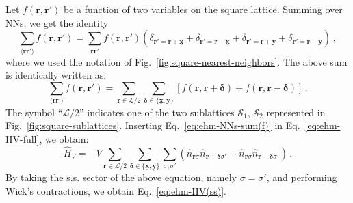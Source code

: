 \begin{tabproof}

	Let $f(\mathbf{r},\mathbf{r}')$ be a function of two variables on the square lattice. Summing over NNs, we get the identity
	\[
		\sum_{\langle \mathbf{r}\mathbf{r}' \rangle} f(\mathbf{r},\mathbf{r}') = \sum_{\mathbf{r}\mathbf{r}'} f(\mathbf{r},\mathbf{r}') \left(
			\delta_{\mathbf{r}'=\mathbf{r}+\underline{\mathbf{x}}} + \delta_{\mathbf{r}'=\mathbf{r}-\underline{\mathbf{x}}} + \delta_{\mathbf{r}'=\mathbf{r}+\underline{\mathbf{y}}} + \delta_{\mathbf{r}'=\mathbf{r}-\underline{\mathbf{y}}}
		\right) \, ,
	\]
	where we used the notation of Fig.~\ref{fig:square-nearest-neighbors}. The above sum is identically written as:
	\begin{equation}\label{eq:ehm-NNs-sum(f)}
		\sum_{\langle \mathbf{r}\mathbf{r}' \rangle} f(\mathbf{r},\mathbf{r}') = \sum_{\mathbf{r}\in\mathcal{L}/2} \sum_{\bm{\delta}\in \lbrace \underline{\mathbf{x}}, \underline{\mathbf{y}} \rbrace} \left[
			f(\mathbf{r},\mathbf{r}+\bm{\delta}) + f(\mathbf{r},\mathbf{r}-\bm{\delta})
		\right] \, .
	\end{equation}
	The symbol ``$\mathcal{L}/2$'' indicates one of the two sublattices $\mathcal{S}_1$, $\mathcal{S}_2$ represented in Fig.~\ref{fig:square-sublattices}. Inserting Eq.~\eqref{eq:ehm-NNs-sum(f)} in Eq.~\eqref{eq:ehm-HV-full}, we obtain:
	\begin{equation}\label{eq:ehm-HV-full-NNs}
		\hat H_V = -V \sum_{\mathbf{r} \in \mathcal{L}/2} \sum_{\bm{\delta}\in \lbrace \underline{\mathbf{x}}, \underline{\mathbf{y}} \rbrace} \sum_{\sigma,\sigma'} \left(
			\hat n_{\mathbf{r}\sigma} \hat n_{\mathbf{r}+\bm{\delta} \sigma'} + \hat n_{\mathbf{r}\sigma} \hat n_{\mathbf{r}-\bm{\delta}\sigma'}
		\right) \, .
	\end{equation}
	By taking the s.s. sector of the above equation, namely $\sigma=\sigma'$, and performing Wick's contractions, we obtain Eq.~\eqref{eq:ehm-HV(ss)}.

\end{tabproof}

